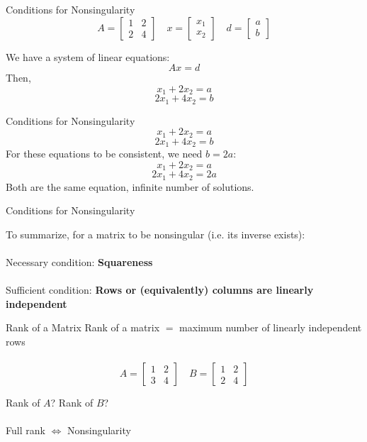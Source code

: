 \documentclass{./../../Latex/teaching_slides}
\begin{document}
\begin{frame}{Conditions for Nonsingularity}
$$
A=\left[\begin{array}{ll}
1 & 2 \\
2 & 4
\end{array}\right]
\quad  x=\left[\begin{array}{ll}
x_1 \\
x_2
\end{array}\right]
\quad d=\left[\begin{array}{ll}
a \\
b
\end{array}\right]
$$
\vspace{1em}

We have a system of linear equations:
$$ Ax = d $$
Then, 
$$ x_1+2x_2 = a $$
$$ 2x_1+4x_2 = b $$
\end{frame}

\begin{frame}{Conditions for Nonsingularity}
$$ x_1+2x_2 = a $$
$$ 2x_1+4x_2 = b $$
For these equations to be consistent, we need $b=2a$:
$$ x_1+2x_2 = a $$
$$ 2x_1+4x_2 = 2a $$
Both are the same equation, infinite number of solutions.
\end{frame}

\begin{frame}{Conditions for Nonsingularity}
\vspace{1em}

To summarize, for a matrix to be nonsingular (i.e. its inverse exists): \\~\\

Necessary condition: \textbf{Squareness} \\~\\

Sufficient condition: \textbf{Rows or (equivalently) columns are linearly independent} 

\end{frame}


\begin{frame}{Rank of a Matrix}
Rank of a matrix $=$ maximum number of linearly independent rows \\~\\
$$A=\left[\begin{array}{ll}
1 & 2 \\
3 & 4
\end{array}\right]
\quad
B=\left[\begin{array}{ll}
1 & 2 \\
2 & 4
\end{array}\right]
$$
\vspace{1em}

Rank of $A$? Rank of $B$? \\~\\
\pause
Full rank $ \iff $ Nonsingularity
\end{frame}
\end{document}
